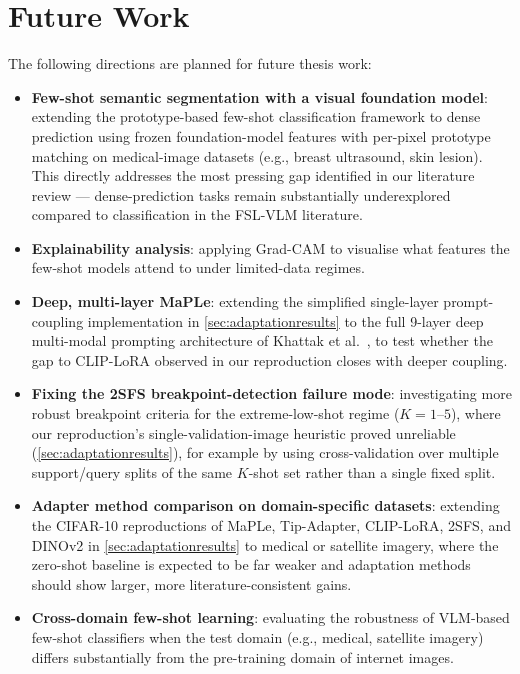 \documentclass{iutbscthesis}
\begin{document}
\section{Future Work}

The following directions are planned for future thesis work:

\begin{itemize}
    \item \textbf{Few-shot semantic segmentation with a visual foundation model}: extending the prototype-based few-shot classification framework to dense prediction using frozen foundation-model features with per-pixel prototype matching on medical-image datasets (e.g., breast ultrasound, skin lesion). This directly addresses the most pressing gap identified in our literature review --- dense-prediction tasks remain substantially underexplored compared to classification in the FSL-VLM literature.
    \item \textbf{Explainability analysis}: applying Grad-CAM to visualise what features the few-shot models attend to under limited-data regimes.
    \item \textbf{Deep, multi-layer MaPLe}: extending the simplified single-layer prompt-coupling implementation in \autoref{sec:adaptationresults} to the full 9-layer deep multi-modal prompting architecture of Khattak et al.\ \cite{khattak2023maple}, to test whether the gap to CLIP-LoRA observed in our reproduction closes with deeper coupling.
    \item \textbf{Fixing the 2SFS breakpoint-detection failure mode}: investigating more robust breakpoint criteria for the extreme-low-shot regime ($K=1$--$5$), where our reproduction's single-validation-image heuristic proved unreliable (\autoref{sec:adaptationresults}), for example by using cross-validation over multiple support/query splits of the same $K$-shot set rather than a single fixed split.
    \item \textbf{Adapter method comparison on domain-specific datasets}: extending the CIFAR-10 reproductions of MaPLe, Tip-Adapter, CLIP-LoRA, 2SFS, and DINOv2 in \autoref{sec:adaptationresults} to medical or satellite imagery, where the zero-shot baseline is expected to be far weaker and adaptation methods should show larger, more literature-consistent gains.
    \item \textbf{Cross-domain few-shot learning}: evaluating the robustness of VLM-based few-shot classifiers when the test domain (e.g., medical, satellite imagery) differs substantially from the pre-training domain of internet images.
\end{itemize}
\end{document}
